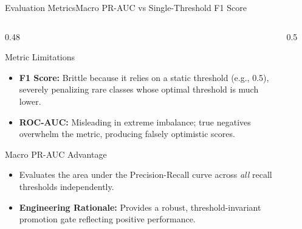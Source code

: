 \begin{frame}{Evaluation Metrics}{Macro PR-AUC vs Single-Threshold F1 Score}
    \begin{columns}[T]
        \begin{column}{0.48\textwidth}
            \begin{block}{Metric Limitations}
                \footnotesize
                \begin{itemize}
                    \item \textbf{F1 Score:} Brittle because it relies on a static threshold (e.g., 0.5), severely penalizing rare classes whose optimal threshold is much lower.
                    \item \textbf{ROC-AUC:} Misleading in extreme imbalance; true negatives overwhelm the metric, producing falsely optimistic scores.
                \end{itemize}
            \end{block}
            \vspace{-0.2cm}
            \begin{block}{Macro PR-AUC Advantage}
                \footnotesize
                \begin{itemize}
                    \item Evaluates the area under the Precision-Recall curve across \emph{all} recall thresholds independently.
                    \item \textbf{Engineering Rationale:} Provides a robust, threshold-invariant promotion gate reflecting positive performance.
                \end{itemize}
            \end{block}
        \end{column}
        \begin{column}{0.5\textwidth}
            \vspace{-0.2cm}
            \begin{figure}
                \centering
\end{figure}
\end{column}
\end{columns}
\end{frame}
